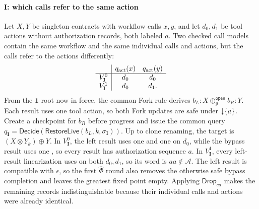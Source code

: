 \paragraph{\(\mathbf I\): which calls refer to the same action}
Let \(X,Y\) be singleton contracts with workflow calls \(x,y\), and let \(d_0,d_1\) be tool actions without authorization records, both labeled \(a\).
Two checked call models contain the same workflow and the same individual calls and actions, but the calls refer to the actions differently:
\[
\begin{array}{c|cc}
 &q_{\rm act}(x)&q_{\rm act}(y)\\ \hline
 V_{\mathbf I}^0&d_0&d_0\\
 V_{\mathbf I}^1&d_0&d_1 .
\end{array}
\]
From the \(\mathbf 1\) root now in force, the common Fork rule derives \(b_L{:}X\oplus_g^{\mathsf{open}}b_R{:}Y\).
Each result uses one tool action, so both Fork updates are safe under \(\mathord{\downarrow}\{a\}\).
Create a checkpoint for \(b_R\) before progress and issue the common query \(q_{\mathbf I}=\mathsf{Decide}(\mathsf{RestoreLive}(b_L,k,\sigma_{\mathbf I}))\).
Up to clone renaming, the target is \((X\otimes Y_k)\oplus Y\).
In \(V_{\mathbf I}^0\), the left result uses one \Fresh and one \Alias on \(d_0\), while the bypass result uses one \Fresh, so every result has authorization sequence \(a\).
In \(V_{\mathbf I}^1\), every left-result linearization uses \Fresh on both \(d_0,d_1\), so its word is \(aa\notin\mathcal A\).
The left result is compatible with \(\epsilon\), so the first \(\widehat\Phi\) round also removes the otherwise safe bypass completion and leaves the greatest fixed point empty.
Applying \(\mathsf{Drop}_{ca}\) makes the remaining records indistinguishable because their individual calls and actions were already identical.

